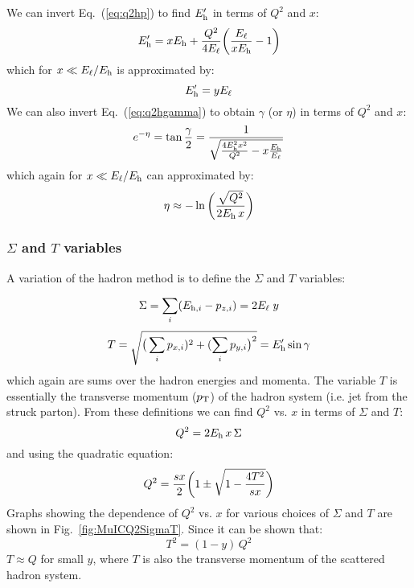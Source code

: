\documentclass[12pt]{article}
\begin{document}
We can invert Eq.~(\ref{eq:q2hp}) to find $E^\prime_{\rm h}$ in terms of $Q^2$ and $x$:
%
\begin{equation}
E^\prime_{\rm h}  = xE_{\rm h} + {Q^2 \over 4 E_\ell}\bigg({E_\ell \over x E_{\rm h}} - 1 \bigg)
\label{eq:hp}
\end{equation}
%
which for $x \ll E_\ell/E_{\rm h}$ is approximated by:
%
\begin{equation}
E^\prime_{\rm h}  = yE_\ell 
\end{equation}
%
We can also invert Eq.~(\ref{eq:q2hgamma}) to obtain $\gamma$ (or $\eta$) in terms of $Q^2$ and $x$:
%
\begin{equation}
e^{-\eta} = \tan {\gamma \over 2}   = { 1 \over \sqrt{{4E_{\rm h}^2 x^2 \over Q^2} - x {E_{\rm h} \over E_\ell} }  }  
\label{eq:gamma}
\end{equation}
%
which again for $x \ll E_\ell/E_{\rm h}$ can approximated by:
%
\begin{equation}
\eta \approx -\ln \bigg( {\sqrt{Q^2} \over 2 E_{\rm h}\, x } \bigg)
\end{equation}
%

\subsubsection{$\Sigma$ and $T$ variables}

A variation of the hadron method is to define the $\Sigma$ and $T$
variables:

\begin{equation}
\Sigma = \sum_i (E_{{\rm h},i}-p_{z,i}) =  2 E_\ell\; y
  \label{eq:sigma}
\end{equation}
%
\begin{equation}
T = \sqrt{  \big(\sum_i p_{x,i})^2 + (\sum_i p_{y,i} \big)^2  } = E^\prime_{\rm h} \sin\gamma
  \label{eq:T}
\end{equation}
%
which again are sums over the  hadron energies and momenta. The
variable $T$ is essentially the transverse momentum ($p_{\rm T}$) of
the hadron system (i.e. jet from the struck parton). From these definitions
we can find $Q^2$ vs. $x$ in terms of $\Sigma$ and $T$:
%
\begin{equation}
Q^2 = 2 E_{\rm h} \, x\, \Sigma
  \label{eq:Q2Sigma}
\end{equation}
%
and using the quadratic equation:
%
\begin{equation}
Q^2 = {s x \over 2} \bigg(1 \pm \sqrt{1-{4T^2\over sx}}  \bigg)
  \label{eq:Q2T}
\end{equation}
%
Graphs showing the dependence of $Q^2$ vs. $x$ for various choices of
$\Sigma$ and $T$ are shown in Fig.~\ref{fig:MuICQ2SigmaT}.
Since it can be shown that:
%
\begin{equation}
T^2 =  (1-y)\,Q^2 
\end{equation}
%
$T \approx Q$ for small $y$, where $T$ is also the transverse momentum
of the scattered hadron system.
\end{document}
